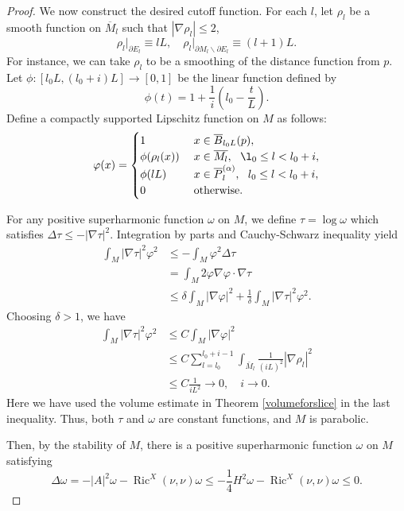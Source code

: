 \documentclass[11pt,letterpaper]{amsart}
\DeclareMathOperator{\Ric}{Ric}
\newcommand{\oM}{\overline{M}}
\newcommand{\oP}{\overline{P}}
\theoremstyle{definition}
\theoremstyle{remark}
\numberwithin{equation}{section}
\begin{document}
\begin{proof}
We now construct the desired cutoff function. For each $l$, let $\rho_l$ be a smooth function on $\oM_l$ such that $|\nabla \rho_l|\leqslant 2$,
    \begin{equation*}
        \rho_l\big|_{\partial E_l}\equiv lL, \quad \rho_l\big|_{\partial M_l\backslash \partial E_l}\equiv (l+1)L.
    \end{equation*}
    For instance, we can take $\rho_l$ to be a smoothing of the distance function from $p$. Let $\phi:[l_0L,(l_0+i)L]\to [0,1]$ be the linear function defined by
    \[\phi(t)=1+\frac{1}{i}(l_0-\frac{t}{L}).\] Define a compactly supported Lipschitz function on $M$ as follows:
    \[\varphi(x)=\begin{cases}
        1 \ \ \ \ \ \ \ \ \ \ & x \in \overline{B}_{l_0L}(p),\\
        \phi(\rho_l(x)) & x\in  \overline{M_l}, \ \ \l_0\leq l<l_0+i,\\
        \phi(lL)  & x\in \oP_l^{(\alpha)}, \ \ l_0\leq l<l_0+i,\\
        0 &  \text{otherwise}.
    \end{cases}
    \]

For any positive superharmonic function $\omega$ on $M$, we define $\tau=\log \omega$ which satisfies $\Delta \tau\leq -|\nabla\tau|^2.$ Integration by parts and Cauchy-Schwarz inequality yield
\begin{align*}
    \int_M|\nabla\tau|^2\varphi^2&\leq -\int_M \varphi^2\Delta \tau\\
    &=\int_M2\varphi\nabla\varphi\cdot\nabla\tau\\
    &\leq \delta\int_M|\nabla\varphi|^2+\frac{1}{\delta}\int_M|\nabla\tau|^2\varphi^2.
\end{align*}
Choosing $\delta>1$, we have
\begin{align*}
    \int_M|\nabla\tau|^2\varphi^2&\leq C\int_M|\nabla\varphi|^2\\
    &\leq C\sum_{l=l_0}^{l_0+i-1}\int_{\bar{M}_l}\frac{1}{(iL)^2}|\nabla \rho_l|^2\\
    &\leq C\frac{1}{iL^2}\to 0, \quad i \to 0.
\end{align*}
Here we have used the volume estimate in Theorem \ref{volumeforslice} in the last inequality. Thus, both $\tau$ and $\omega$ are constant functions, and $M$ is parabolic.

Then, by the stability of $M$, there is a positive superharmonic function $\omega$ on $M$ satisfying
\[\Delta \omega=-|A|^2\omega-\Ric^X(\nu,\nu)\omega\leq -\frac{1}{4}H^2\omega-\Ric^X(\nu,\nu)\omega\leq 0.\]



\end{proof}
\end{document}
